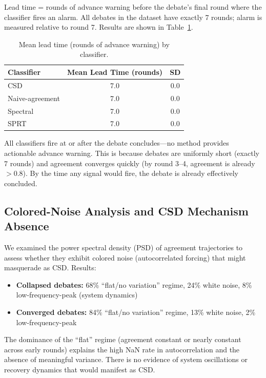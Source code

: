 \documentclass[11pt,letterpaper]{article}
\begin{document}
Lead time = rounds of advance warning before the debate's final round where the classifier fires an alarm. All debates in the dataset have exactly 7 rounds; alarm is measured relative to round 7. Results are shown in Table~\ref{tab:leadtime}.

\begin{table}[!htbp]
\centering
\caption{Mean lead time (rounds of advance warning) by classifier.}
\label{tab:leadtime}
\begin{tabular}{lcc}
\toprule
Classifier & Mean Lead Time (rounds) & SD \\
\midrule
CSD & 7.0 & 0.0 \\
Naive-agreement & 7.0 & 0.0 \\
Spectral & 7.0 & 0.0 \\
SPRT & 7.0 & 0.0 \\
\bottomrule
\end{tabular}
\end{table}

All classifiers fire at or after the debate concludes---no method provides actionable advance warning. This is because debates are uniformly short (exactly 7 rounds) and agreement converges quickly (by round 3--4, agreement is already $>$0.8). By the time any signal would fire, the debate is already effectively concluded.

\subsection{Colored-Noise Analysis and CSD Mechanism Absence}

We examined the power spectral density (PSD) of agreement trajectories to assess whether they exhibit colored noise (autocorrelated forcing) that might masquerade as CSD. Results:

\begin{itemize}
\item \textbf{Collapsed debates:} 68\% ``flat/no variation'' regime, 24\% white noise, 8\% low-frequency-peak (system dynamics)
\item \textbf{Converged debates:} 84\% ``flat/no variation'' regime, 13\% white noise, 2\% low-frequency-peak
\end{itemize}

The dominance of the ``flat'' regime (agreement constant or nearly constant across early rounds) explains the high NaN rate in autocorrelation and the absence of meaningful variance. There is no evidence of system oscillations or recovery dynamics that would manifest as CSD.
\end{document}
